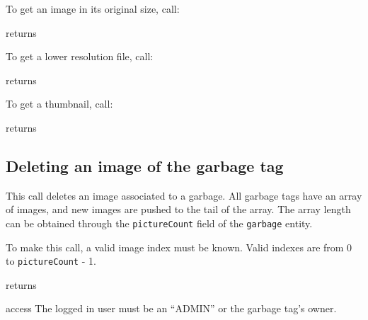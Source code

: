 To get an image in its original size, call:

\begin{apidata}{returns}
  \begin{datalist}
  \end{datalist}
\end{apidata}

To get a lower resolution file, call:

\begin{apidata}{returns}
  \begin{datalist}
  \end{datalist}
\end{apidata}

To get a thumbnail, call:

\begin{apidata}{returns}
  \begin{datalist}
  \end{datalist}
\end{apidata}


\subsection{Deleting an image of the garbage tag}

This call deletes an image associated to a garbage. All garbage tags have an
array of images, and new images are pushed to the tail of the array. The array
length can be obtained through the \texttt{pictureCount} field of the
\texttt{garbage} entity. 

To make this call, a valid image index must be known. Valid indexes are from 0
to \texttt{pictureCount} - 1.

\begin{apidata}{returns}
  \begin{datalist}
  \end{datalist}
\end{apidata}
\begin{apidata}{access}
The logged in user must be an ``ADMIN'' or the garbage tag's owner.
\end{apidata}


